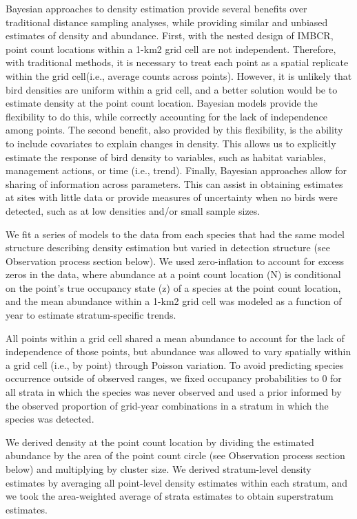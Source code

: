 \documentclass[
  letterpaper,
  DIV=11,
  numbers=noendperiod,
  oneside]{scrreprt}
\begin{document}
Bayesian approaches to density estimation provide several benefits over
traditional distance sampling analyses, while providing similar and
unbiased estimates of density and abundance. First, with the nested
design of IMBCR, point count locations within a 1-km2 grid cell are not
independent. Therefore, with traditional methods, it is necessary to
treat each point as a spatial replicate within the grid cell(i.e.,
average counts across points). However, it is unlikely that bird
densities are uniform within a grid cell, and a better solution would be
to estimate density at the point count location. Bayesian models provide
the flexibility to do this, while correctly accounting for the lack of
independence among points. The second benefit, also provided by this
flexibility, is the ability to include covariates to explain changes in
density. This allows us to explicitly estimate the response of bird
density to variables, such as habitat variables, management actions, or
time (i.e., trend). Finally, Bayesian approaches allow for sharing of
information across parameters. This can assist in obtaining estimates at
sites with little data or provide measures of uncertainty when no birds
were detected, such as at low densities and/or small sample sizes.

We fit a series of models to the data from each species that had the
same model structure describing density estimation but varied in
detection structure (see Observation process section below). We used
zero-inflation to account for excess zeros in the data, where abundance
at a point count location (N) is conditional on the point's true
occupancy state (z) of a species at the point count location, and the
mean abundance within a 1-km2 grid cell was modeled as a function of
year to estimate stratum-specific trends.

All points within a grid cell shared a mean abundance to account for the
lack of independence of those points, but abundance was allowed to vary
spatially within a grid cell (i.e., by point) through Poisson variation.
To avoid predicting species occurrence outside of observed ranges, we
fixed occupancy probabilities to 0 for all strata in which the species
was never observed and used a prior informed by the observed proportion
of grid-year combinations in a stratum in which the species was
detected.

We derived density at the point count location by dividing the estimated
abundance by the area of the point count circle (see Observation process
section below) and multiplying by cluster size. We derived stratum-level
density estimates by averaging all point-level density estimates within
each stratum, and we took the area-weighted average of strata estimates
to obtain superstratum estimates.
\end{document}
